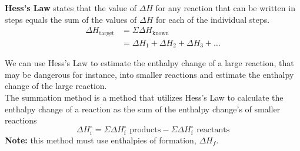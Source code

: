 \textbf{Hess's Law} states that the value of $\Delta H$ for any reaction that can be written in
steps equals the sum of the values of $\Delta H$ for each of the individual steps.
\begin{align*}
    \Delta H_\text{target}&=\Sigma\Delta H_\text{known}\\
                          &=\Delta H_1+\Delta H_2+\Delta H_3+\dots
\end{align*}

We can use Hess's Law to estimate the enthalpy change of a large reaction, that may be dangerous
for instance, into smaller reactions and estimate the enthalpy change of the large reaction.\\

The summation method is a method that utilizes Hess's Law to calculate the enthalpy change of a
reaction as the sum of the enthalpy change's of smaller reactions
\[
    \Delta H^\circ_\text{r}=\Sigma\Delta H^\circ_\text{f}\text{ products}-\Sigma\Delta H^\circ_\text{f}\text{ reactants}
\]
\textbf{Note:} this method must use enthalpies of formation, $\Delta H_f$.

%
%
%
%
%
%
